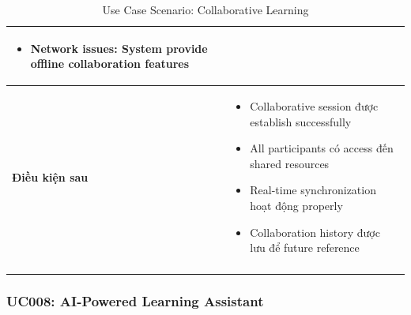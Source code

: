 \begin{longtable}{|p{4cm}|p{10cm}|}
\begin{itemize}
    \item Network issues: System provide offline collaboration features
\end{itemize} \\ \hline
\textbf{Điều kiện sau} & 
\begin{itemize}
    \item Collaborative session được establish successfully
    \item All participants có access đến shared resources
    \item Real-time synchronization hoạt động properly
    \item Collaboration history được lưu để future reference
\end{itemize} \\ \hline
\caption{Use Case Scenario: Collaborative Learning}
\label{tab:uc007} \\
\end{longtable}

\subsubsection{UC008: AI-Powered Learning Assistant}

